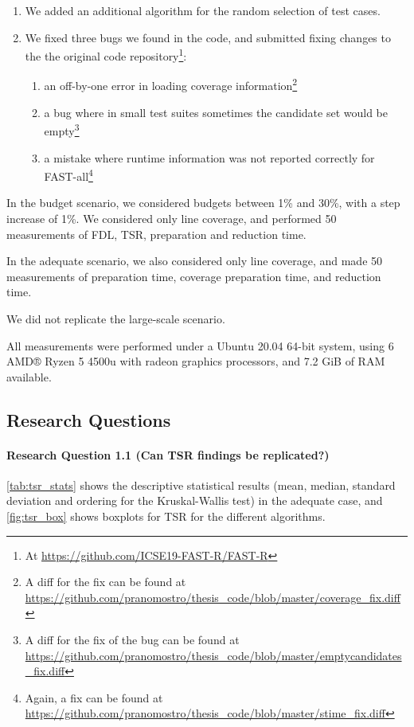 \begin{enumerate}
\item We added an additional algorithm for the random selection of test cases.
\item We fixed three bugs we found in the code, and submitted fixing changes to the the original code repository\footnote{At \url{https://github.com/ICSE19-FAST-R/FAST-R}}:
	\begin{enumerate}
	\item an off-by-one error in loading coverage information\footnote{A diff for the fix can be found at \url{https://github.com/pranomostro/thesis_code/blob/master/coverage_fix.diff}}
	\item a bug where in small test suites sometimes the candidate set would be empty\footnote{A diff for the fix of the bug can be found at \url{https://github.com/pranomostro/thesis_code/blob/master/emptycandidates_fix.diff}}
	\item a mistake where runtime information was not reported correctly for FAST-all\footnote{Again, a fix can be found at \url{https://github.com/pranomostro/thesis_code/blob/master/stime_fix.diff}}
	\end{enumerate}
\end{enumerate}

In the budget scenario, we considered budgets between 1\% and 30\%, with
a step increase of 1\%. We considered only line coverage, and performed
50 measurements of FDL, TSR, preparation and reduction time.

In the adequate scenario, we also considered only line coverage, and
made 50 measurements of preparation time, coverage preparation time,
and reduction time.

We did not replicate the large-scale scenario.

All measurements were performed under a Ubuntu 20.04 64-bit system,
using 6 AMD® Ryzen 5 4500u with radeon graphics processors, and 7.2
GiB of RAM available.

\subsection{Research Questions}

\paragraph{Research Question 1.1 (Can TSR findings be replicated?)}

\autoref{tab:tsr_stats} shows the descriptive statistical results (mean,
median, standard deviation and ordering for the Kruskal-Wallis test)
in the adequate case, and \autoref{fig:tsr_box} shows boxplots for TSR
for the different algorithms.

